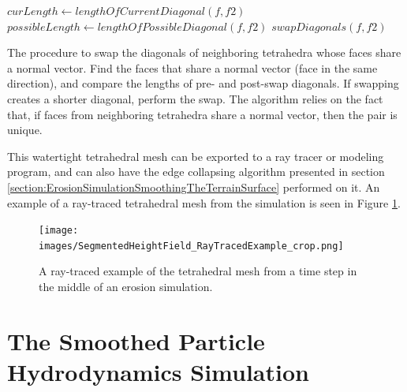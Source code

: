 
\begin{algorithm}[t]
\begin{algorithmic}
	    \STATE $curLength \gets lengthOfCurrentDiagonal( f, f2 )$
	    \STATE $possibleLength \gets lengthOfPossibleDiagonal( f, f2 )$
	      \STATE $swapDiagonals( f, f2 )$
	    \ENDIF
	  \ENDIF
	\ENDFOR
      \ENDFOR
    \ENDFOR
  \ENDFOR
\end{algorithmic}
\caption[Algorithm for tetra swapping]
{\label{algorithm:TetraSwapping} The procedure to swap the diagonals of neighboring tetrahedra whose faces share a normal vector. Find the faces that share a normal vector (face in the same direction), and compare the lengths of pre- and post-swap diagonals. If swapping creates a shorter diagonal, perform the swap. The algorithm relies on the fact that, if faces from neighboring tetrahedra share a normal vector, then the pair is unique.}
\end{algorithm}

This watertight tetrahedral mesh can be exported to a ray tracer or modeling program, and can also have the edge collapsing algorithm presented in section \ref{section:ErosionSimulationSmoothingTheTerrainSurface} performed on it. An example of a ray-traced tetrahedral mesh from the simulation is seen in Figure \ref{figure:RayTracedTetrahedralMesh}.

\begin{figure}[t]
\centering
\begin{minipage}[b]{0.9\linewidth}
\begin{center}
\texttt{[image: images/SegmentedHeightField\_RayTracedExample\_crop.png]}
\end{center}
\end{minipage}
\caption[Ray-traced example of tetrahedral mesh from the erosion simulation]
{\label{figure:RayTracedTetrahedralMesh} A ray-traced example of the tetrahedral mesh from a time step in the middle of an erosion simulation.
}
\end{figure}




\section{The Smoothed Particle Hydrodynamics Simulation}

